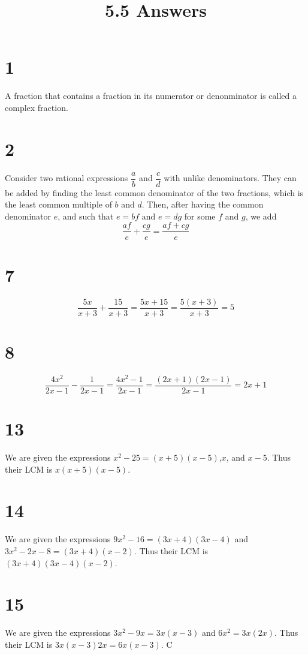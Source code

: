 \documentclass{article}
\title{5.5 Answers}
\theoremstyle{definition}
\newcommand{\?}{\stackrel{?}{=}}
\begin{document}
\maketitle

\section*{1}
A fraction that contains a fraction in its numerator or denonminator is called a complex fraction.

\section*{2}
Consider two rational expressions $\dfrac{a}{b}$ and $\dfrac{c}{d}$ with unlike denominators. They can be added by finding the least common denominator 
of the two fractions, which is the least common multiple of $b$ and $d$. Then, after having the common denominator $e$, and such that 
$e=bf$ and $e=dg$ for some $f$ and $g$, we add \[ \dfrac{af}{e}+\dfrac{cg}{e}=\dfrac{af+cg}{e} \]

\section*{7}
\[ \dfrac{5x}{x+3}+\dfrac{15}{x+3}=\dfrac{5x+15}{x+3}=\dfrac{5(x+3)}{x+3}=5 \]

\section*{8}
\[ \dfrac{4x^2}{2x-1}-\dfrac{1}{2x-1}=\dfrac{4x^2-1}{2x-1}=\dfrac{(2x+1)(2x-1)}{2x-1}=2x+1 \]

\section*{13}
We are given the expressions $x^2-25=(x+5)(x-5)$,$x$, and $x-5$. Thus their LCM is $x(x+5)(x-5)$.

\section*{14}
We are given the expressions $9x^2-16=(3x+4)(3x-4)$ and $3x^2-2x-8=(3x+4)(x-2)$. Thus their LCM is $(3x+4)(3x-4)(x-2)$. 

\section*{15}
We are given the expressions $3x^2-9x=3x(x-3)$ and $6x^2=3x(2x)$. Thus their LCM is $3x(x-3)2x=6x(x-3)$. C
\end{document}
